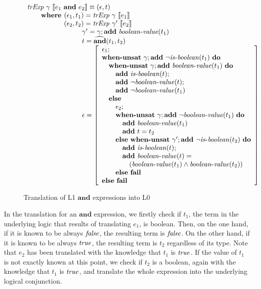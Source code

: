 \begin{figure}
\[
\begin{array}{l}
\trExp{\gamma}{\andE{e_1}{e_2}} \equiv (\epsilon, t)\\
\qquad \textbf{where }(\epsilon_1, t_1) = \trExp{\gamma}{e_1}\\
\qquad \phantom{\textbf{where }}(\epsilon_2, t_2) = \trExp{\gamma'}{e_2}\\
\qquad\qquad\qquad\qquad \gamma' = \gamma;\addE~\booleanvalue{t_1}\\
\qquad\qquad\qquad\qquad t = \widehat{\mathbf{and}}(t_1, t_2)\\
\qquad\qquad\qquad\qquad \epsilon = \left[ 
\begin{array}{l}
\epsilon_1;\\
\whenUnsatW~\gamma;\addE~\neg\isboolean{t_1}~\doW\\
\quad\whenUnsatW~\gamma;\addE~\booleanvalue{t_1}~\doW\\
\quad\quad\addE~\isboolean{t};\\
\quad\quad\addE~\neg\booleanvalue{t};\\
\quad\quad\addE~\neg\booleanvalue{t_1}\\
\quad\elseW\\
\quad\quad\epsilon_2;\\
\quad\quad\whenUnsatW~\gamma;\addE~\neg\booleanvalue{t_1}~\doW\\
\quad\quad\quad\addE~\booleanvalue{t_1}\\
\quad\quad\quad\addE~t = t_2\\
\quad\quad\elseW~\whenUnsatW~\gamma';\addE~\neg\isboolean{t_2}~\doW\\
\quad\quad\quad\addE~\isboolean{t};\\
\quad\quad\quad\addE~\booleanvalue{t} = \\
\quad\quad\quad\quad(\booleanvalue{t_1} \land \booleanvalue{t_2})\\
\quad\quad\elseW~\failE\\
\elseW~\failE
\end{array}
\right] \\
\end{array}
\]
\caption{Translation of L1 $\mathbf{and}$ expressions into L0}
\label{fig:andtr}
\end{figure}

In the translation for an $\mathbf{and}$ expression, we firstly check if $t_1$,
the term in the underlying logic that results of translating $e_1$, is boolean.
Then, on the one hand, if it is known to be always $\mathit{false}$, the resulting term
is $\mathit{false}$.  On the other hand, if it is known to be always $\mathit{true}$, the
resulting term is $t_2$ regardless of its type. Note that $e_2$ has been
translated with the knowledge that $t_1$ is $\mathit{true}$. If the value of $t_1$ is
not exactly known at this point, we check if $t_2$ is a boolean, again with the
knowledge that $t_1$ is $\mathit{true}$, and translate the whole expression into the
underlying logical conjunction.

